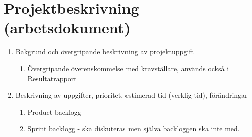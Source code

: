 


\section{Projektbeskrivning (arbetsdokument)}
\begin{enumerate}
\item Bakgrund och övergripande beskrivning av projektuppgift
\begin{enumerate}
\item Övergripande överenskommelse med kravställare, används också i Resultatrapport
\end{enumerate} 
\item Beskrivning av uppgifter, prioritet, estimerad tid (verklig tid), förändringar
\begin{enumerate}
\item Product backlogg 
\item Sprint backlogg - ska diskuteras men själva backloggen ska inte med.
\end{enumerate} 
\end{enumerate}
